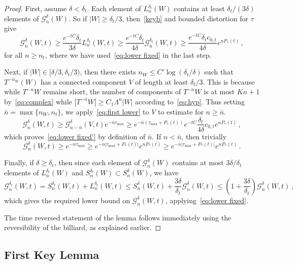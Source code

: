 \documentclass[AHL,Unicode,longabstracts,published]{cedram}
\newcommand{\cG}{\mathcal{G}}
\begin{document}
\begin{proof}
First, assume $\delta < \delta_t$. Each element of $L_n^{\delta_t}(W)$ contains at least $\delta_t/(3 \delta)$ elements of $\cG_n^\delta(W)$. So if $|W| \ge \delta_t/3$, then~\eqref{keyb} and bounded distortion for $\tau$ give
\begin{equation}\label{eq:first lower}
\cG_n^\delta(W,t) \ge \frac{e^{- tC}\delta_t}{3 \delta} L_n^{\delta_t}(W,t)
\ge \frac{e^{- tC}\delta_t}{4 \delta} \cG_n^{\delta_t}(W,t)
\ge \frac{e^{- tC} \delta_t c_{0,t}}{4 \delta} e^{n P_*(t)} \,,
\end{equation}
for all $n\ge n_t$, where we have used~\eqref{eq:lower fixed} in the last step.

Next, if $|W| \in [\delta/3, \delta_t/3)$, then there exists $n_W \le C' \log(\delta_t/\delta)$ such that $T^{-n_W}(W)$ has a connected component $V$ of length at least $\delta_t/3$. This is because while $T^{-n}W$ remains short, the number of components of $T^{-n}W$ is at most $Kn+1$ by~\eqref{eq:complex} while $|T^{-n}W| \ge C_1 \Lambda^n |W|$ according to~\eqref{eq:hyp}. Thus setting $\bar n = \max 
\{ n_W, n_t \}$, we apply~\eqref{eq:first lower} to $V$ to estimate for $n \ge \bar n$.
\[
\cG_n^\delta(W,t) \ge \cG^\delta_{n - \bar n}(V, t) e^{- \bar n \tau_{\max}}
\ge e^{- \bar n (\tau_{\max} + P_*(t))} e^{- tC} \frac{\delta_t}{4 \delta} c_{0,t} e^{n P_*(t)} \,,
\]
which proves~\eqref{eq:lower fixed'} by definition of $\bar n$. If $n < \bar n$, then trivially
\[
\cG_n^\delta(W,t) \ge e^{- n \tau_{\max}}
\ge e^{- n \left|\tau_{\max} + P_*(t)\right|} e^{n P_*(t)}
\ge e^{- \bar n\left|\tau_{\max} + P_*(t)\right|} e^{n P_*(t)} \,.
\]

Finally, if $\delta \ge \delta_t$, then since each element of $\cG^{\delta}_n(W)$ contains at most $3\delta/\delta_t$ elements of $L^{\delta_t}_n(W)$ and $S^{\delta_t}_n(W) \subset S^\delta_n(W)$, we have
\[
\cG_n^{\delta_t}(W,t) = S^{\delta_t}_n(W,t) + L^{\delta_t}_n(W,t)
\le S^{\delta}_n(W,t) + \frac{3 \delta}{\delta_t} \cG^{\delta}_n(W,t)
\le \left(1 + \frac{3 \delta}{\delta_t} \right) \cG^{\delta}_n(W,t) \,,
\]
which gives the required lower bound on $\cG^\delta_n(W,t)$, applying~\eqref{eq:lower fixed}.

The time reversed statement of the lemma follows immediately using the reversibility of the billiard, as explained earlier.
\end{proof}



\subsection{First Key Lemma}\label{KL}
\end{document}
